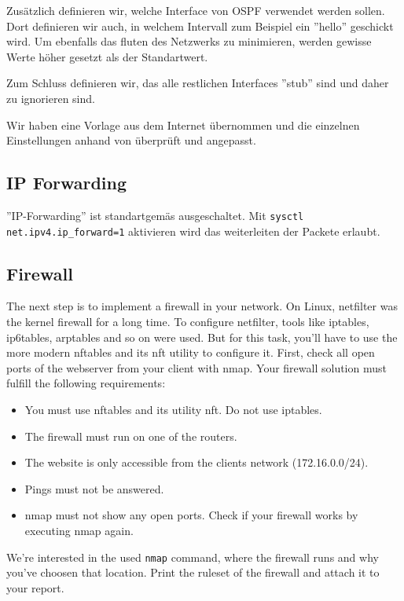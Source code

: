 \documentclass[11pt,titlepage]{article}
\newenvironment{shadedquotation}
 {\begin{shaded*}
  \quoting[leftmargin=0pt, vskip=0pt]
 }
 {\endquoting
 \end{shaded*}
}
\begin{document}
Zusätzlich definieren wir, welche Interface von OSPF verwendet werden sollen. Dort definieren wir auch, in welchem Intervall zum Beispiel ein ''hello'' geschickt wird.
Um ebenfalls das fluten des Netzwerks zu minimieren, werden gewisse Werte höher gesetzt als der Standartwert.

Zum Schluss definieren wir, das alle restlichen Interfaces ''stub'' sind und daher zu ignorieren sind.

\medskip
Wir haben eine Vorlage aus dem Internet übernommen \cite{BIRD_EXAMPLE} und die einzelnen Einstellungen anhand von \cite{BIRD_DOC} überprüft und angepasst.

\subsection{IP Forwarding}
\label{subsec:IPForwarding}

''IP-Forwarding'' ist standartgemäs ausgeschaltet. Mit \lstinline!sysctl net.ipv4.ip_forward=1! aktivieren wird das weiterleiten der Packete erlaubt.

\subsection{Firewall}
\label{subsec:Firewall}
\begin{shadedquotation}
	The next step is to implement a firewall in your network. On Linux, netfilter was the kernel
	firewall for a long time. To configure netfilter, tools like iptables, ip6tables, arptables and so
	on were used. But for this task, you’ll have to use the more modern nftables and its nft utility
	to configure it.
	First, check all open ports of the webserver from your client with nmap. Your firewall solution
	must fulfill the following requirements:
	\begin{itemize}
		\item You must use nftables and its utility nft. Do not use iptables.
		\item The firewall must run on one of the routers.
		\item The website is only accessible from the clients network (172.16.0.0/24).
		\item Pings must not be answered.
		\item nmap must not show any open ports. Check if your firewall works by executing nmap again.
	\end{itemize}
\end{shadedquotation}

\begin{shadedquotation}
  We’re interested in the used \lstinline!nmap! command, where the firewall runs and why you’ve choosen that location. Print the ruleset of the firewall and attach it to your report.
\end{shadedquotation}
\end{document}
